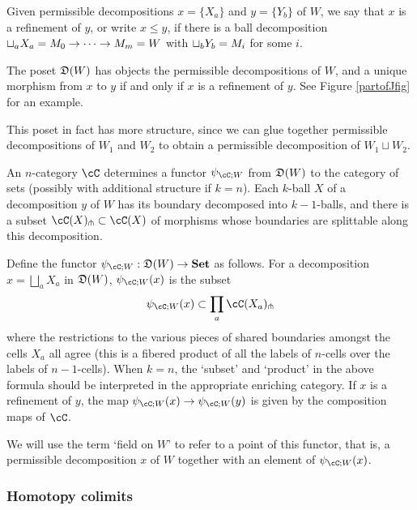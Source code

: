 \documentclass{pnastwo}
\begin{document}
\begin{article}
Given permissible decompositions $x = \{X_a\}$ and $y = \{Y_b\}$ of $W$, we say that $x$ is a refinement
of $y$, or write $x \le y$, if there is a ball decomposition $\sqcup_a X_a = M_0\to\cdots\to M_m = W$
with $\sqcup_b Y_b = M_i$ for some $i$.

\begin{defn}
The poset $\mathfrak{D}(W)$ has objects the permissible decompositions of $W$, 
and a unique morphism from $x$ to $y$ if and only if $x$ is a refinement of $y$.
See Figure \ref{partofJfig} for an example.
\end{defn}

This poset in fact has more structure, since we can glue together permissible decompositions of $W_1$ and $W_2$ to obtain a permissible decomposition of $W_1 \sqcup W_2$. 

An $n$-category $\cC$ determines 
a functor $\psi_{\cC;W}$ from $\mathfrak{D}(W)$ to the category of sets 
(possibly with additional structure if $k=n$).
Each $k$-ball $X$ of a decomposition $y$ of $W$ has its boundary decomposed into $k{-}1$-balls,
and there is a subset $\cC(X)\spl \subset \cC(X)$ of morphisms whose boundaries
are splittable along this decomposition.

\begin{defn}
Define the functor $\psi_{\cC;W} : \cell(W) \to \Set$ as follows.
For a decomposition $x = \bigsqcup_a X_a$ in $\mathfrak{D}(W)$, $\psi_{\cC;W}(x)$ is the subset
\begin{equation*}
	\psi_{\cC;W}(x) \subset \prod_a \cC(X_a)\spl
\end{equation*}
where the restrictions to the various pieces of shared boundaries amongst the cells
$X_a$ all agree (this is a fibered product of all the labels of $n$-cells over the labels of $n-1$-cells). When $k=n$, the `subset' and `product' in the above formula should be interpreted in the appropriate enriching category.
If $x$ is a refinement of $y$, the map $\psi_{\cC;W}(x) \to \psi_{\cC;W}(y)$ is given by the composition maps of $\cC$.
\end{defn}

We will use the term `field on $W$' to refer to a point of this functor,
that is, a permissible decomposition $x$ of $W$ together with an element of $\psi_{\cC;W}(x)$.


\subsubsection{Homotopy colimits}


\end{article}
\end{document}
